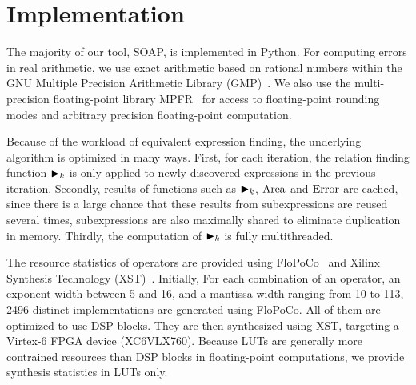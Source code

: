 \section{Implementation}
\label{sec:implementation}

The majority of our tool, SOAP, is implemented in Python. For computing
errors in real arithmetic, we use exact arithmetic based on rational numbers
within the GNU Multiple Precision Arithmetic Library (GMP)~\cite{gmp}. We
also use the multi-precision floating-point library MPFR~\cite{mpfr} for
access to floating-point rounding modes and arbitrary precision floating-point
computation.

Because of the workload of equivalent expression finding, the underlying
algorithm is optimized in many ways. First, for each iteration, the relation
finding function $\operatorname{\blacktriangleright}_k$ is only applied to newly discovered expressions
in the previous iteration. Secondly, results of functions such as $\operatorname{\blacktriangleright}_k$,
$\operatorname{\mathrm{Area}}$ and $\operatorname{\mathrm{Error}}$ are cached, since there is a large chance that these
results from subexpressions are reused several times, subexpressions are also
maximally shared to eliminate duplication in memory. Thirdly, the computation
of $\operatorname{\blacktriangleright}_k$ is fully multithreaded.

The resource statistics of operators are provided using FloPoCo~\cite{flopoco}
and Xilinx Synthesis Technology (XST)~\cite{xst}. Initially, For each
combination of an operator, an exponent width between 5 and 16, and a mantissa
width ranging from 10 to 113, 2496 distinct implementations are generated
using FloPoCo. All of them are optimized to use DSP blocks. They are then
synthesized using XST, targeting a Virtex-6 FPGA device (XC6VLX760). Because
LUTs are generally more contrained resources than DSP blocks in floating-point
computations, we provide synthesis statistics in LUTs only.
